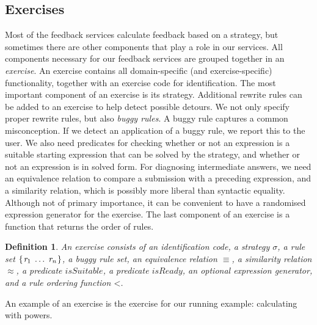 \documentclass[copyright]{eptcs}
\newcommand{\Varid}[1]{\mathit{#1}}
\newtheorem{definition}[thm]{Definition}
\begin{document}
\subsection{Exercises}
\label{ssec:exercise}
Most of the feedback services calculate feedback based on a strategy, but
sometimes there are other components that play a role in our services. All
components necessary for our feedback services are grouped together in an
\emph{exercise}. An exercise contains all domain-specific (and
exercise-specific) functionality, together with an exercise code for
identification. The most important component of an exercise is its
strategy. Additional rewrite rules can be added to an exercise to help detect
possible detours. We not only specify proper rewrite rules, but also \emph{buggy
  rules}. A buggy rule captures a common misconception. If we detect an
application of a buggy rule, we report this to the user. We also need predicates
for checking whether or not an expression is a suitable starting expression that
can be solved by the strategy, and whether or not an expression is in solved
form. For diagnosing intermediate answers, we need an equivalence relation to
compare a submission with a preceding expression, and a similarity relation,
which is possibly more liberal than syntactic equality. Although not of primary
importance, it can be convenient to have a randomised expression generator for
the exercise. The last component of an exercise is a function that returns the
order of rules.

\begin{definition}
  An exercise consists of an identification code, a strategy \ensuremath{\sigma}, a rule set \ensuremath{\{\mskip1.5mu \Varid{r}_{1}\;\ldots\;\mathit{r_n}\mskip1.5mu\}}, a buggy rule set, an equivalence relation \ensuremath{\equiv }, a similarity
  relation \ensuremath{\approx}, a predicate \ensuremath{\Varid{isSuitable}}, a predicate \ensuremath{\Varid{isReady}}, an
  optional expression generator, and a rule ordering function \ensuremath{\mathbin{<}}.
\end{definition}
\noindent
An example of an exercise is the exercise for our running example: calculating 
with powers. 
\end{document}
